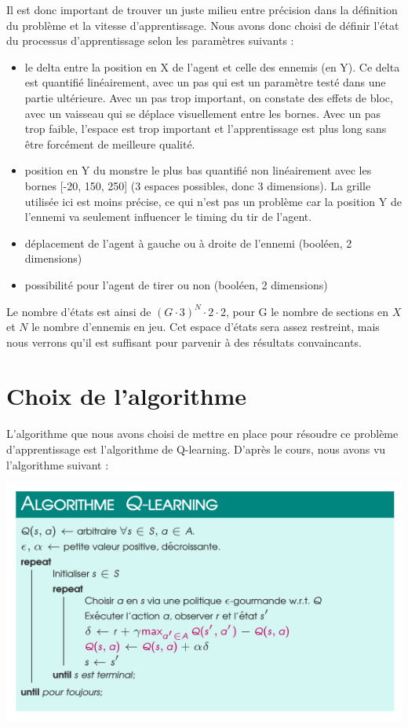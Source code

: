 \documentclass{article}
\begin{document}
Il est donc important de trouver un juste milieu entre précision dans la définition du problème et la vitesse d'apprentissage. Nous avons donc choisi de définir l'état du processus d'apprentissage selon les paramètres suivants :
\begin{itemize}
\item le delta entre la position en X de l'agent et celle des ennemis (en Y). Ce delta est quantifié linéairement, avec un pas qui est un paramètre testé dans une partie ultérieure. Avec un pas trop important, on constate des effets de bloc, avec un vaisseau qui se déplace visuellement entre les bornes. Avec un pas trop faible, l'espace est trop important et l'apprentissage est plus long sans être forcément de meilleure qualité.
\item position en Y du monstre le plus bas quantifié non linéairement avec les bornes [-20, 150, 250] (3 espaces possibles, donc 3 dimensions). La grille utilisée ici est moins précise, ce qui n'est pas un problème car la position Y de l'ennemi va seulement influencer le timing du tir de l'agent.
\item déplacement de l'agent à gauche ou à droite de l'ennemi (booléen, 2 dimensions)
\item possibilité pour l'agent de tirer ou non (booléen, 2 dimensions)
\end{itemize}

Le nombre d'états est ainsi de $(G \cdot 3)^{N} \cdot 2 \cdot 2$, pour G le nombre de sections en $X$ et $N$ le nombre d'ennemis en jeu. Cet espace d'états sera assez restreint, mais nous verrons qu'il est suffisant pour parvenir à des résultats convaincants.


\section{Choix de l'algorithme}

L'algorithme que nous avons choisi de mettre en place pour résoudre ce problème d'apprentissage est l'algorithme de Q-learning.
\newline
D'après le cours, nous avons vu l'algorithme suivant :
\newline

\includegraphics[scale=0.5]{pote.png}
\end{document}
